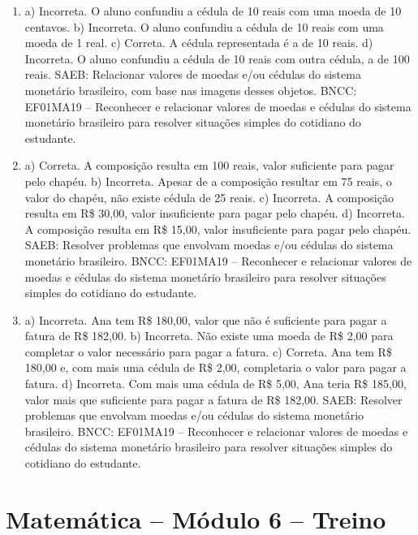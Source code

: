 \begin{enumerate}
\item
a) Incorreta. O aluno confundiu a cédula de 10 reais com uma moeda de 10 centavos.
b) Incorreta. O aluno confundiu a cédula de 10 reais com uma moeda de 1 real.
c) Correta. A cédula representada é a de 10 reais.
d) Incorreta. O aluno confundiu a cédula de 10 reais com outra cédula, a de 100 reais.
SAEB: Relacionar valores de moedas e/ou cédulas do sistema
monetário brasileiro, com base nas imagens desses objetos.
BNCC: EF01MA19 -- Reconhecer e relacionar valores de moedas e cédulas do
sistema monetário brasileiro para resolver situações simples do
cotidiano do estudante.

\item
a) Correta. A composição resulta em 100 reais, valor suficiente para pagar pelo chapéu.
b) Incorreta. Apesar de a composição resultar em 75 reais, o valor do chapéu, não existe cédula de 25 reais.
c) Incorreta. A composição resulta em R\$ 30,00, valor insuficiente para pagar pelo chapéu.
d) Incorreta. A composição resulta em R\$ 15,00, valor insuficiente para pagar pelo chapéu.
SAEB: Resolver problemas que envolvam moedas e/ou cédulas do
sistema monetário brasileiro.
BNCC: EF01MA19 -- Reconhecer e relacionar valores de moedas e cédulas do
sistema monetário brasileiro para resolver situações simples do
cotidiano do estudante.

\item
a) Incorreta. Ana tem R\$ 180,00, valor que não é suficiente para pagar a fatura de R\$ 182,00.
b) Incorreta. Não existe uma moeda de R\$ 2,00 para completar o valor necessário para pagar a fatura.
c) Correta. Ana tem R\$ 180,00 e, com mais uma cédula de R\$ 2,00, completaria o valor para pagar a fatura.
d) Incorreta. Com mais uma cédula de R\$ 5,00, Ana teria R\$ 185,00, valor mais que suficiente para pagar a fatura de R\$ 182,00.
SAEB: Resolver problemas que envolvam moedas e/ou cédulas do
sistema monetário brasileiro.
BNCC: EF01MA19 -- Reconhecer e relacionar valores de moedas e cédulas do
sistema monetário brasileiro para resolver situações simples do
cotidiano do estudante.
\end{enumerate}

\section*{Matemática – Módulo 6 – Treino}

